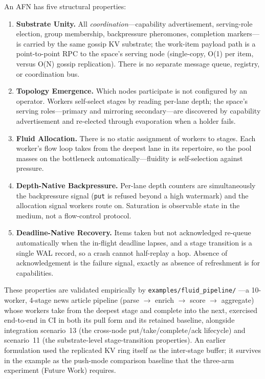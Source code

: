 \documentclass[11pt]{article}
\begin{document}
An AFN has five structural properties:

\begin{enumerate}
\item \textbf{Substrate Unity.} All \emph{coordination}---capability
  advertisement, serving-role election, group membership, backpressure pheromones,
  completion markers---is carried by the same gossip KV substrate; the work-item
  payload path is a point-to-point RPC to the space's serving node (single-copy,
  O(1) per item, versus O(N) gossip replication). There is no separate message
  queue, registry, or coordination bus.

\item \textbf{Topology Emergence.} Which nodes participate is not configured by
  an operator. Workers self-select stages by reading per-lane depth; the space's
  serving roles---primary and mirroring secondary---are discovered by capability
  advertisement and re-elected through evaporation when a holder fails.

\item \textbf{Fluid Allocation.} There is no static assignment of workers to
  stages. Each worker's flow loop takes from the deepest lane in its repertoire,
  so the pool masses on the bottleneck automatically---fluidity is self-selection
  against pressure.

\item \textbf{Depth-Native Backpressure.} Per-lane depth counters are
  simultaneously the backpressure signal (\texttt{put} is refused beyond a high
  watermark) and the allocation signal workers route on. Saturation is observable
  state in the medium, not a flow-control protocol.

\item \textbf{Deadline-Native Recovery.} Items taken but not acknowledged
  re-queue automatically when the in-flight deadline lapses, and a stage
  transition is a single WAL record, so a crash cannot half-replay a hop. Absence
  of acknowledgement is the failure signal, exactly as absence of refreshment is
  for capabilities.
\end{enumerate}

These properties are validated empirically by \texttt{examples/fluid\_pipeline/}
---a 10-worker, 4-stage news article pipeline (parse $\to$ enrich $\to$ score
$\to$ aggregate) whose workers take from the deepest stage and complete into the
next, exercised end-to-end in CI in both its pull form and its retained baseline,
alongside integration scenario~13 (the cross-node put/take/complete/ack
lifecycle) and scenario~11 (the substrate-level stage-transition properties). An
earlier formulation used the replicated KV ring itself as the inter-stage
buffer; it survives in the example as the push-mode comparison baseline that the
three-arm experiment (Future Work) requires.
\end{document}
